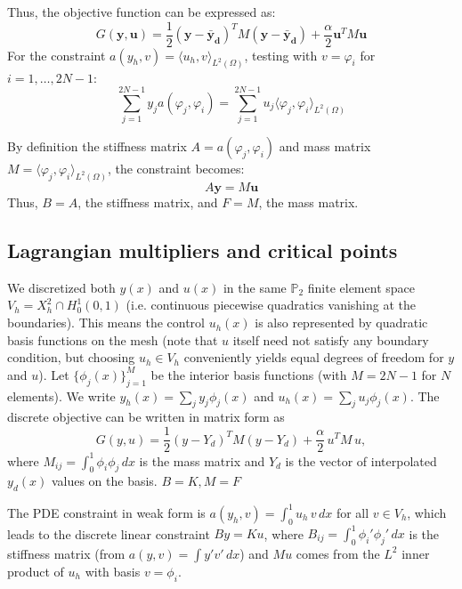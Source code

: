 \documentclass[a4paper,10pt]{article}
\begin{document}
Thus, the objective function can be expressed as:
\[
	G(\mathbf{y},\mathbf{u}) = \frac{1}{2}(\mathbf{y}-\mathbf{\bar{y}_d})^T M (\mathbf{y}-\mathbf{\bar{y}_d}) + \frac{\alpha}{2} \mathbf{u}^T M \mathbf{u}
\]
For the constraint \(a(y_h,v) = \langle u_h,v \rangle_{L^2(\Omega)}\), testing with \(v = \varphi_i\) for \(i=1,\dots,2N-1\):
\[
	\sum_{j=1}^{2N-1} y_j a(\varphi_j,\varphi_i) = \sum_{j=1}^{2N-1} u_j \langle \varphi_j,\varphi_i \rangle_{L^2(\Omega)}
\]

By definition the stiffness matrix \(A = a(\varphi_j,\varphi_i)\) and mass matrix \(M = \langle \varphi_j,\varphi_i \rangle_{L^2(\Omega)}\), the constraint becomes:
\[
	A \mathbf{y} = M \mathbf{u}
\]
 Thus, \(B = A\), the stiffness matrix, and \(F = M\), the mass matrix.

\subsection{Lagrangian multipliers and critical points}
We discretized both $y(x)$ and $u(x)$ in the same $\mathbb{P}_2$ finite element space $V_h = X_h^2 \cap H_0^1(0,1)$ (i.e. continuous piecewise quadratics vanishing at the boundaries). This means the control $u_h(x)$ is also represented by quadratic basis functions on the mesh (note that $u$ itself need not satisfy any boundary condition, but choosing $u_h\in V_h$ conveniently yields equal degrees of freedom for $y$ and $u$). Let $\{\phi_j(x)\}_{j=1}^{M}$ be the interior basis functions (with $M=2N-1$ for $N$ elements). We write $y_h(x)=\sum_j y_j\phi_j(x)$ and $u_h(x)=\sum_j u_j\phi_j(x)$. The discrete objective can be written in matrix form as
\[
	G(y,u) = \frac{1}{2}(y-Y_d)^T M(y-Y_d) + \frac{\alpha}{2}\,u^T M\,u,
\]
where $M_{ij}=\int_0^1 \phi_i\phi_j\,dx$ is the mass matrix and $Y_d$ is the vector of interpolated $y_d(x)$ values on the basis. $B = K, M = F$

The PDE constraint in weak form is $a(y_h,v) = \int_0^1 u_h\,v\,dx$ for all $v\in V_h$, which leads to the discrete linear constraint $By = Ku$, where $B_{ij}=\int_0^1 \phi_i'\phi_j'\,dx$ is the stiffness matrix (from $a(y,v)=\int y'v'\,dx$) and $Mu$ comes from the $L^2$ inner product of $u_h$ with basis $v=\phi_i$.
\end{document}
